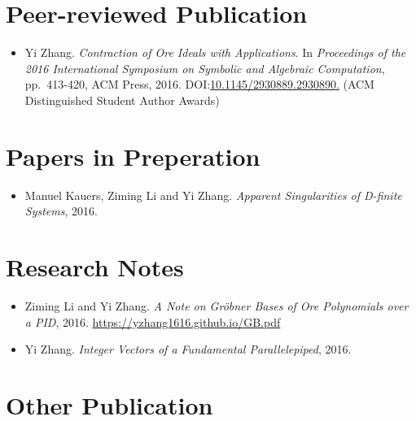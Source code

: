 \documentclass[a4paper,12pt]{article}
\begin{document}
\section*{\Large{Peer-reviewed Publication}}
\begin{itemize}
 \item Yi Zhang. {\em Contraction of Ore Ideals with Applications}. 
       In {\em Proceedings of the 2016 International Symposium on Symbolic and Algebraic Computation}, 
       pp.\ 413-420, ACM Press, 2016. DOI:\href{http://dl.acm.org/citation.cfm?id=2930890}{10.1145/2930889.2930890.} 
       (ACM Distinguished Student Author Awards)
\end{itemize}

\section*{\Large{Papers in Preperation}}
\begin{itemize}
 \item Manuel Kauers, Ziming Li and Yi Zhang. {\em Apparent Singularities of D-finite Systems}, 2016. 
\end{itemize}

\section*{\Large{Research Notes}}
\begin{itemize}
 \item Ziming Li and Yi Zhang. {\em A Note on Gr\"{o}bner Bases of Ore Polynomials over a PID}, 2016. 
 \url{https://yzhang1616.github.io/GB.pdf} 
 \item Yi Zhang. {\em Integer Vectors of a Fundamental Parallelepiped}, 2016.
\end{itemize}

\section*{\Large{Other Publication}}
\end{document}
